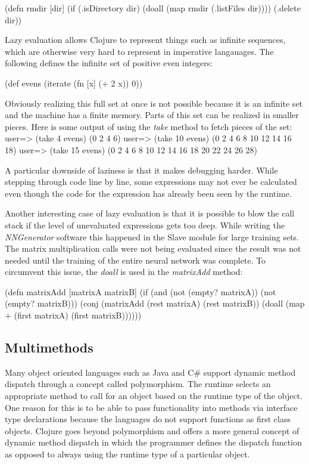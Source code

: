 (defn rmdir [dir]
  (if (.isDirectory dir)
      (doall (map rmdir (.listFiles dir))))
  (.delete dir))

Lazy evaluation allows Clojure to represent things such as infinite sequences,
which are otherwise very hard to represent in imperative langauages. 
The following defines the infinite set of positive even integers: 

(def evens (iterate (fn [x] (+ 2 x)) 0))

Obviously realizing this full set at once is not possible because it
is an infinite set and the machine has a finite memory.
Parts of this set can be realized in smaller pieces. Here is some
output of using the {\it take} method to fetch pieces of the set: 
user=> (take 4 evens)
(0 2 4 6)
user=> (take 10 evens)
(0 2 4 6 8 10 12 14 16 18)
user=> (take 15 evens)
(0 2 4 6 8 10 12 14 16 18 20 22 24 26 28)

A particular downside of laziness is that it makes debugging harder. 
While stepping through code line by line, some expressions may not
ever be calculated even though the code for the expression has already
been seen by the runtime.

Another interesting case of lazy evaluation is that it is possible to
blow the call stack if the level of unevaluated expressions gets too
deep. While writing the {\em NNGenerator} software this happened in
the Slave module for large training sets. The matrix multiplication
calls were not being evaluated since the result was not needed until
the training of the entire neural network was complete.
To circumvent this issue, the {\it doall} is used in the {\it
  matrixAdd} method:
 
(defn matrixAdd [matrixA matrixB]
  (if (and (not (empty? matrixA)) (not (empty? matrixB)))
    (conj
      (matrixAdd (rest matrixA) (rest matrixB))
      (doall (map + (first matrixA) (first matrixB))))))

\subsection{Multimethods}
Many object oriented languages such as Java and C\# support dynamic
method dispatch through a concept called polymorphism. 
The runtime selects an appropriate method to call for an object based
on the runtime type of the object. 
One reason for this is to be able to pass functionality into methods via interface type declarations because the languages do not support functions as first class objects. 
Clojure goes beyond polymorphism and offers a more general concept of dynamic method dispatch in which the programmer defines
the dispatch function as opposed to always using the runtime type of a particular object. 

